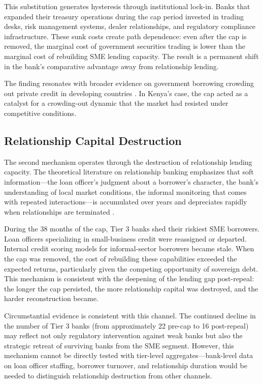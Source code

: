 \documentclass[12pt]{article}
\begin{document}
This substitution generates hysteresis through institutional lock-in. Banks that expanded their treasury operations during the cap period invested in trading desks, risk management systems, dealer relationships, and regulatory compliance infrastructure. These sunk costs create path dependence: even after the cap is removed, the marginal cost of government securities trading is lower than the marginal cost of rebuilding SME lending capacity. The result is a permanent shift in the bank's comparative advantage away from relationship lending.

The finding resonates with broader evidence on government borrowing crowding out private credit in developing countries \citep{gennaioli2014sovereign, asongu2014determinants}. In Kenya's case, the cap acted as a catalyst for a crowding-out dynamic that the market had resisted under competitive conditions.

\subsection{Relationship Capital Destruction}

The second mechanism operates through the destruction of relationship lending capacity. The theoretical literature on relationship banking emphasizes that soft information---the loan officer's judgment about a borrower's character, the bank's understanding of local market conditions, the informal monitoring that comes with repeated interactions---is accumulated over years and depreciates rapidly when relationships are terminated \citep{petersen1994benefits, boot2000can, berger2005does}.

During the 38 months of the cap, Tier 3 banks shed their riskiest SME borrowers. Loan officers specializing in small-business credit were reassigned or departed. Internal credit scoring models for informal-sector borrowers became stale. When the cap was removed, the cost of rebuilding these capabilities exceeded the expected returns, particularly given the competing opportunity of sovereign debt. This mechanism is consistent with the deepening of the lending gap post-repeal: the longer the cap persisted, the more relationship capital was destroyed, and the harder reconstruction became.

Circumstantial evidence is consistent with this channel. The continued decline in the number of Tier 3 banks (from approximately 22 pre-cap to 16 post-repeal) may reflect not only regulatory intervention against weak banks but also the strategic retreat of surviving banks from the SME segment. However, this mechanism cannot be directly tested with tier-level aggregates---bank-level data on loan officer staffing, borrower turnover, and relationship duration would be needed to distinguish relationship destruction from other channels.
\end{document}
